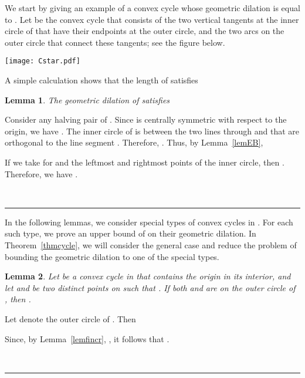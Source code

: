 \documentclass[12pt]{article}
\newtheorem{lemma}{Lemma}
\newcommand{\qed}{\rule{0.5em}{1.5ex}}
\newcommand{\fqed}{{\hfill~\qed}}
\newenvironment{proof}{{\noindent \bf Proof.}}
                      {{\hfill \fqed} \vspace{1em}}
\begin{document}
We start by giving an example of a convex cycle whose geometric dilation 
is equal to . Let  be the convex cycle that consists of 
the two vertical tangents at the inner circle of  that have 
their endpoints at the outer circle, and the two arcs on the outer 
circle that connect these tangents; see the figure below. 

\begin{center}
   \texttt{[image: Cstar.pdf]}
\end{center}

A simple calculation shows that the length of  satisfies 
 

\begin{lemma}  \label{lemCstar} 
The geometric dilation of  satisfies 
 
\end{lemma} 
\begin{proof} 
Consider any halving pair  of . Since  is centrally 
symmetric with respect to the origin, we have . The inner circle
of  is between the two lines through  and  that are 
orthogonal to the line segment . Therefore, . 
Thus, by Lemma~\ref{lemEB}, 
 
If we take for  and  the leftmost and rightmost points of the inner 
circle, then . Therefore, we have 
. 
\end{proof}  

In the following lemmas, we consider special types of convex cycles in 
. For each such type, we prove an upper bound of  
on their geometric dilation. In Theorem~\ref{thmcycle}, we will consider 
the general case and reduce the problem of bounding the geometric 
dilation to one of the special types.   

\begin{lemma}   \label{lemoutercircle} 
Let  be a convex cycle in  that contains the origin in 
its interior, and let  and  be two distinct points on  
such that . If both  and  are on the 
outer circle of , then . 
\end{lemma} 
\begin{proof} 
Let  denote the outer circle of . Then   
 
Since, by Lemma~\ref{lemfincr}, , it follows that 
. 
\end{proof} 
\end{document}
